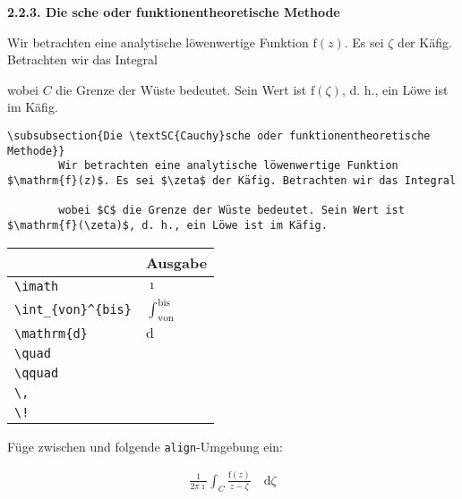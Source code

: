 \documentclass["WS\space 16-17\space -\space LaTeX-Kurs\space -\space Praesentation\space -\space 1.tex"]{subfiles}
\begin{document}
\begin{frame}[fragile]
	\Losung
	\begin{outputbox}
		{ \large\textbf{2.2.3. Die  sche oder funktionentheoretische Methode}}
		
		Wir betrachten eine analytische löwenwertige Funktion $\mathrm{f}(z)$. Es sei $\zeta$ der Käfig. Betrachten wir das Integral
		
	    wobei $C$ die Grenze der Wüste bedeutet. Sein Wert ist $\mathrm{f}(\zeta)$, d. h., ein Löwe ist im Käfig.
    \end{outputbox}

	\Code
	\begin{lstlisting}[gobble=4]
    \subsubsection{Die \textSC{Cauchy}sche oder funktionentheoretische Methode}}
		Wir betrachten eine analytische löwenwertige Funktion $\mathrm{f}(z)$. Es sei $\zeta$ der Käfig. Betrachten wir das Integral
		
		wobei $C$ die Grenze der Wüste bedeutet. Sein Wert ist $\mathrm{f}(\zeta)$, d. h., ein Löwe ist im Käfig.
	\end{lstlisting}
\end{frame}
\begin{frame}[fragile]
	\begin{center}
		\begin{tabular}{ll}
			\toprule
			\color{math-cmd}{Mathe}\color{black}{-Befehl}							&	Ausgabe					\\ \midrule
			\lstinline|\imath|				&	$\imath$					\\
			\lstinline|\int_{von}^{bis}|		&	$\int_{\mathrm{von}}^{\mathrm{bis}}$		\\ \addlinespace[0.5em]
			\lstinline|\mathrm{d}|		&	$\mathrm{d}$		
		    \\ 			
		    \lstinline|\quad|		&	$\quad$		
	        \\ 
			\lstinline|\qquad|		&	$\qquad$		
			\\
			\lstinline|\,|					&	$\,$		\\
			\lstinline|\!|					&	$\!$		\\
			\bottomrule
		\end{tabular}
	\end{center}
	\pause\btVFill
	\Aufgabee
		Füge zwischen  und  folgende \lstinline[basicstyle=\normalfont\normalsize]|align|-Umgebung ein:
	\begin{outputbox}
	    \begin{align}
		    \frac{1}{2 \pi \imath} \int_C \frac{\mathrm{f}(z)}{z - \zeta} \quad \! \! \mathrm{d} \zeta
	    \end{align}	
	\end{outputbox}
	\vspace{0.2cm}
\end{frame}
\end{document}
